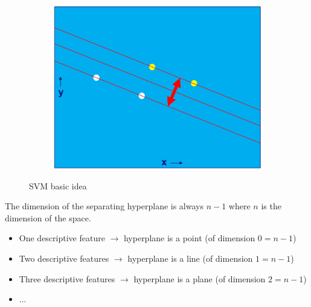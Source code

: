 \begin{figure}[H]
  \begin{subfigure}{0.3\textwidth}
    \centering
    \includegraphics[width=1\textwidth]{assets/svm/b__idea_sv_cleared.png} 
  \end{subfigure}\hspace*{0.05\textwidth}
  \begin{subfigure}{0.6\textwidth}
  \end{subfigure}
  \caption{SVM basic idea}
  \label{fig:5_basic_principle}
\end{figure}

The dimension of the separating hyperplane is always $n-1$ where $n$ is the dimension of the space.
\begin{itemize}
  \item One descriptive feature $\rightarrow$ hyperplane is a point (of dimension $0=n-1$)
  \item Two descriptive features $\rightarrow$ hyperplane is a line (of dimension $1=n-1$)
  \item Three descriptive features $\rightarrow$ hyperplane is a plane (of dimension $2=n-1$)
  \item $\dots$
\end{itemize}

